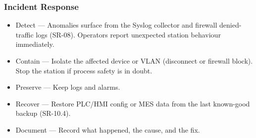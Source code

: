 \subsubsection{Incident Response}
\begin{itemize}
    \item Detect — Anomalies surface from the Syslog collector and firewall denied-traffic logs (SR-08). Operators report unexpected station behaviour immediately.
    \item Contain — Isolate the affected device or VLAN (disconnect or firewall block). Stop the station if process safety is in doubt.
    \item Preserve — Keep logs and alarms.
    \item Recover — Restore PLC/HMI config or MES data from the last known-good backup (SR-10.4).
    \item Document — Record what happened, the cause, and the fix. 
\end{itemize}

